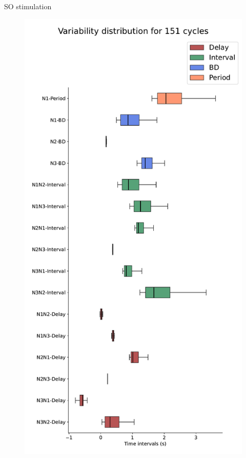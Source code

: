 \documentclass[aspectratio=43]{beamer}
\begin{document}
\begin{frame}{SO stimulation}
\begin{figure}[hbt!]
\begin{minipage}[b]{0.36\textwidth}
					\includegraphics[width=\textwidth]{invariants/data/MODEL/so_driven/images/3phases/_boxplot.pdf}
				\end{minipage}
				\begin{minipage}[b]{0.44\textwidth}
					\centering

\end{minipage}
\end{figure}
\end{frame}
\end{document}
